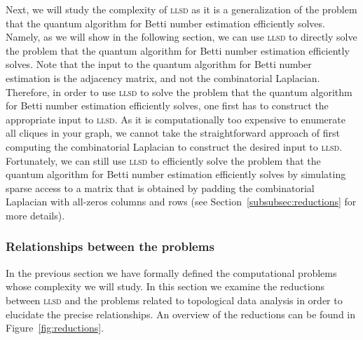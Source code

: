 \documentclass[a4paper, onecolumn, accepted=2022-08-28]{quantumarticle}
\begin{document}
Next, we will study the complexity of \textsc{llsd} as it is a generalization of the problem that the quantum algorithm for Betti number estimation efficiently solves.
Namely, as we will show in the following section, we can use \textsc{llsd} to directly solve the problem that the quantum algorithm for Betti number estimation efficiently solves.
Note that the input to the quantum algorithm for Betti number estimation is the adjacency matrix, and not the combinatorial Laplacian.
Therefore, in order to use \textsc{llsd} to solve the problem that the quantum algorithm for Betti number estimation efficiently solves, one first has to construct the appropriate input to \textsc{llsd}.
As it is computationally too expensive to enumerate all cliques in your graph, we cannot take the straightforward approach of first computing the combinatorial Laplacian to construct the desired input to \textsc{llsd}. 
Fortunately, we can still use \textsc{llsd} to efficiently solve the problem that the quantum algorithm for Betti number estimation efficiently solves by simulating sparse access to a matrix that is obtained by padding the combinatorial Laplacian with all-zeros columns and rows (see Section~\ref{subsubsec:reductions} for more details).

\subsubsection{Relationships between the problems
\label{subsubsec:reductions}}

In the previous section we have formally defined the computational problems whose complexity we will study.
In this section we examine the reductions between \textsc{llsd} and the problems related to topological data analysis in order to elucidate the precise relationships.
An overview of the reductions can be found in Figure~\ref{fig:reductions}.
\end{document}
